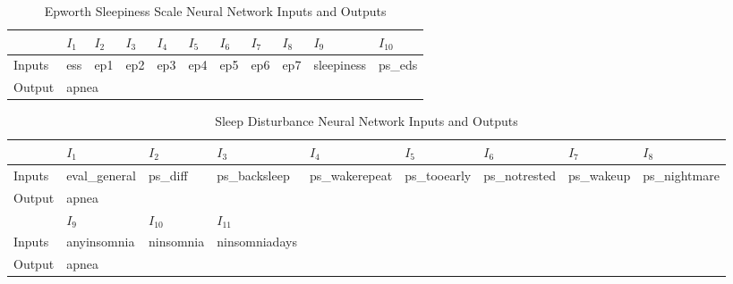 \documentclass[10pt,conference,a4paper]{IEEEtran}
\begin{document}
\begin{table}[ht]
\centering
\caption{Epworth Sleepiness Scale Neural Network Inputs and Outputs}
\begin{tabular}{|l|l|l|l|l|l|l|l|l|l|l|}
\hline
       & $I_1$ & $I_2$ & $I_3$ & $I_4$ & $I_5$ & $I_6$ & $I_7$ & $I_8$ & $I_9$      & $I_{10}$  \\ \hline
Inputs & ess   & ep1   & ep2   & ep3   & ep4   & ep5   & ep6   & ep7   & sleepiness & ps\_eds \\ \hline
Output & \multicolumn{10}{l|}{apnea}                                                          \\ \hline
\end{tabular}
\end{table}

\begin{table}[ht]
\centering
\caption{Sleep Disturbance Neural Network Inputs and Outputs}
\begin{tabular}{|l|l|l|l|lllll}
\hline
       & $I_1$         & $I_2$     & $I_3$         & \multicolumn{1}{l|}{$I_4$}          & \multicolumn{1}{l|}{$I_5$}        & \multicolumn{1}{l|}{$I_6$}         & \multicolumn{1}{l|}{$I_7$}      & \multicolumn{1}{l|}{$I_8$}         \\ \hline
Inputs & eval\_general & ps\_diff  & ps\_backsleep & \multicolumn{1}{l|}{ps\_wakerepeat} & \multicolumn{1}{l|}{ps\_tooearly} & \multicolumn{1}{l|}{ps\_notrested} & \multicolumn{1}{l|}{ps\_wakeup} & \multicolumn{1}{l|}{ps\_nightmare} \\ \hline
Output & \multicolumn{8}{l|}{apnea}                                                                                                                                                                                                      \\ \hline
       & $I_9$         & $I_{10}$    & $I_{11}$        &                                     &                                   &                                    &                                 &                                    \\ \cline{1-4}
Inputs & anyinsomnia   & ninsomnia & ninsomniadays &                                     &                                   &                                    &                                 &                                    \\ \cline{1-4}
Output & \multicolumn{3}{l|}{apnea}                &                                     &                                   &                                    &                                 &                                    \\ \cline{1-4}
\end{tabular}
\end{table}
\end{document}
